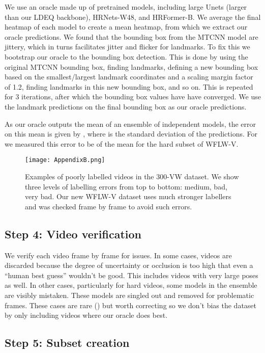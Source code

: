 \documentclass[10pt,twocolumn,letterpaper]{article}
\begin{document}
We use an oracle made up of  pretrained models, including  large Unets (larger than our LDEQ backbone),  HRNets-W48, and  HRFormer-B. We average the final heatmap of each model to create a mean heatmap, from which we extract our oracle predictions. We found that the bounding box from the MTCNN model are jittery, which in turns facilitates jitter and flicker for landmarks. To fix this we bootstrap our oracle to the bounding box detection. This is done by using the original MTCNN bounding box, finding landmarks, defining a new bounding box based on the smallest/largest landmark coordinates and a scaling margin factor of 1.2, finding landmarks in this new bounding box, and so on. This is repeated for 3 iterations, after which the bounding box values have have converged. We use the landmark predictions on the final bounding box as our oracle predictions. 

As our oracle outputs the mean of an ensemble of  independent models, the error on this mean is given by , where  is the standard deviation of the  predictions. For  we measured this error to be  of the mean for the hard subset of WFLW-V. 
\begin{figure*}[t!]
  \centering
   \texttt{[image: AppendixB.png]}
   \caption{Examples of poorly labelled videos in the 300-VW dataset. We show three levels of labelling errors from top to bottom: medium, bad, very bad. Our new WFLW-V dataset uses much stronger labellers and was checked frame by frame to avoid such errors.}
   \label{fig:examples of 300 VW errors}
\end{figure*}

\subsection*{Step 4: Video verification}

We verify each video frame by frame for issues. In some cases, videos are discarded because the degree of uncertainty or occlusion is too high that even a ``human best guess'' wouldn't be good. This includes videos with very large poses as well. In other cases, particularly for hard videos, some models in the ensemble are visibly mistaken. These models are singled out and removed for problematic frames. These cases are rare () but worth correcting so we don't bias the dataset by only including videos where our oracle does best. 

\subsection*{Step 5: Subset creation}
\end{document}
